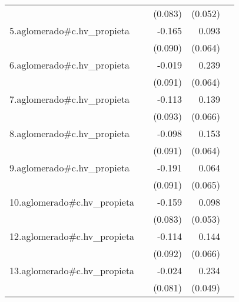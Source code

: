 {\begin{longtable}{l*{4}{D{.}{.}{-1}}}
            &                     &     (0.083)         &     (0.052)         &                     \\
\addlinespace
5.aglomerado#c.hv\_propieta&                     &      -0.165         &       0.093         &                     \\
            &                     &     (0.090)         &     (0.064)         &                     \\
\addlinespace
6.aglomerado#c.hv\_propieta&                     &      -0.019         &       0.239\sym{***}&                     \\
            &                     &     (0.091)         &     (0.064)         &                     \\
\addlinespace
7.aglomerado#c.hv\_propieta&                     &      -0.113         &       0.139\sym{*}  &                     \\
            &                     &     (0.093)         &     (0.066)         &                     \\
\addlinespace
8.aglomerado#c.hv\_propieta&                     &      -0.098         &       0.153\sym{*}  &                     \\
            &                     &     (0.091)         &     (0.064)         &                     \\
\addlinespace
9.aglomerado#c.hv\_propieta&                     &      -0.191\sym{*}  &       0.064         &                     \\
            &                     &     (0.091)         &     (0.065)         &                     \\
\addlinespace
10.aglomerado#c.hv\_propieta&                     &      -0.159         &       0.098         &                     \\
            &                     &     (0.083)         &     (0.053)         &                     \\
\addlinespace
12.aglomerado#c.hv\_propieta&                     &      -0.114         &       0.144\sym{*}  &                     \\
            &                     &     (0.092)         &     (0.066)         &                     \\
\addlinespace
13.aglomerado#c.hv\_propieta&                     &      -0.024         &       0.234\sym{***}&                     \\
            &                     &     (0.081)         &     (0.049)         &                     \\

\end{longtable}}
